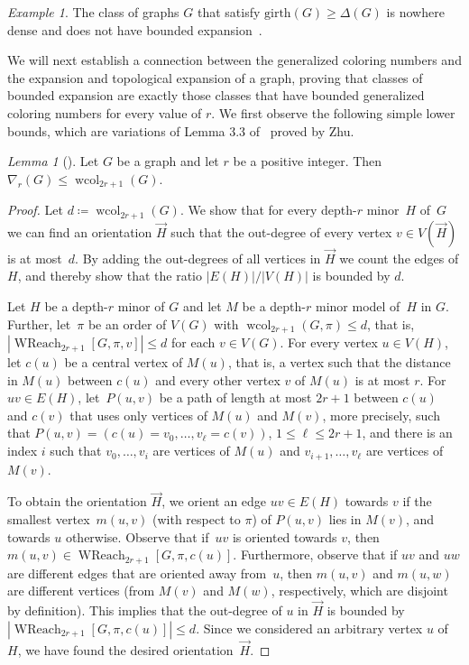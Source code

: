 \documentclass[1p,number,a4paper]{elsarticle}
\theoremstyle{remark}
\DeclareMathOperator{\wcol}{wcol}
\DeclareMathOperator{\WReach}{WReach}
\newtheorem{lemma}[theorem]{Lemma}
\newtheorem{example}[theorem]{Example}
\begin{document}
\begin{example}
The class of graphs $G$ that satisfy $\mathrm{girth}(G)\geq 
\Delta(G)$ is nowhere dense and does not have bounded 
expansion~\cite{nevsetril2012sparsity}.
\end{example}



We will next establish a connection 
between the generalized coloring numbers and the expansion and
topological expansion of a graph, proving that classes of 
bounded expansion are exactly those classes that have 
bounded generalized coloring numbers for every value of $r$. 
We first observe the following simple lower bounds, which 
are variations of Lemma 3.3 of~\cite{zhu2009colouring} proved by Zhu. 

\begin{lemma}[\cite{zhu2009colouring}]\label{lem:wcol-lower-bound}
Let $G$ be a graph and let $r$ be a positive integer. Then 
$\nabla_r(G)\leq \wcol_{2r+1}(G)$. 
\end{lemma}
\begin{proof}
 Let $d\coloneqq \wcol_{2r+1}(G)$. We show that for every 
 depth-$r$ minor~$H$ of~$G$ we can find an orientation $\vec{H}$
such that the out-degree of every vertex $v\in V(\vec{H})$ is at most~$d$. By adding the out-degrees of all vertices in $\vec{H}$ we 
count the edges of $H$, and thereby show that the ratio 
$|E(H)|/|V(H)|$ is bounded by $d$. 

Let $H$ be a depth-$r$ minor of $G$ and let $M$ be a 
depth-$r$ minor model of~$H$ in $G$.
Further, let~$\pi$ be an order of $V(G)$ with
$\wcol_{2r+1}(G,\pi)\leq d$, that is, 
$|\WReach_{2r+1}[G,\pi,v]|\leq d$ 
for each $v\in V(G)$. 
For every vertex $u\in V(H)$, let $c(u)$ be a central vertex of 
$M(u)$, that is, a vertex such that the distance in $M(u)$
between $c(u)$ and every other vertex $v$ of $M(u)$ 
is at most $r$. For $uv\in E(H)$, let~$P(u,v)$ be a path
of length at most $2r+1$ between $c(u)$ and $c(v)$ that
uses only vertices of $M(u)$ and $M(v)$, more precisely, such that
$P(u,v)=(c(u)=v_0,\ldots, v_\ell=c(v))$, $1\leq \ell\leq 2r+1$, and there is an index $i$
such that $v_0,\ldots, v_i$ are vertices of $M(u)$ and $v_{i+1},\ldots, v_\ell$ are vertices of $M(v)$. 

To obtain the orientation $\vec{H}$, we orient an edge $uv\in E(H)$ 
towards $v$ if the smallest vertex~$m(u,v)$ (with respect to $\pi$) of $P(u,v)$ 
lies in $M(v)$, and towards $u$ otherwise. Observe that 
if~$uv$ is oriented towards $v$, then $m(u,v)\in \WReach_{2r+1}[G,\pi, 
c(u)]$. Furthermore, observe that if $uv$ and $uw$ are 
different edges that are oriented away from~$u$, then $m(u,v)$ and
$m(u,w)$ are different vertices (from $M(v)$ and $M(w)$, respectively, which are disjoint by definition). This implies that the out-degree of $u$ in $\vec{H}$ is 
bounded by 
$|\WReach_{2r+1}[G,\pi,c(u)]|\leq d$. Since we considered an arbitrary vertex $u$ of $H$, we have found the desired orientation~$\vec{H}$. 
\end{proof}
\end{document}
